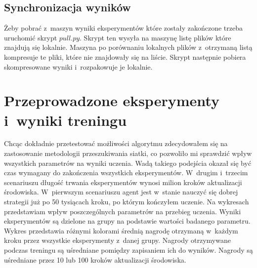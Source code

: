 \documentclass[12pt, oneside]{article}
\begin{document}
\subsection{Synchronizacja wyników}
Żeby pobrać z~maszyn wyniki eksperymentów które zostały zakończone trzeba uruchomić skrypt $pull.py$. Skrypt ten wysyła na maszynę listę plików które znajdują się lokalnie. Maszyna po porównaniu lokalnych plików z~otrzymaną listą kompresuje te pliki, które nie znajdowały się na liście. Skrypt następnie pobiera skompresowane wyniki i~rozpakowuje je lokalnie.

\section{Przeprowadzone eksperymenty i~wyniki treningu}
Chcąc dokładnie przetestować możliwości algorytmu zdecydowałem się na zastosowanie metodologii przeszukiwania siatki, co pozwoliło mi sprawdzić wpływ wszystkich parametrów na wyniki uczenia. Wadą takiego podejścia okazał się być czas wymagany do zakończenia wszystkich eksperymentów. 
W~drugim i~trzecim scenariuszu długość trwania eksperymentów wynosi milion kroków aktualizacji środowiska. W~pierwszym scenariuszu agent jest w~stanie nauczyć się dobrej strategii już po 50 tysiącach kroku, po którym kończyłem uczenie.
Na wykresach przedstawiam wpływ poszczególnych parametrów na przebieg uczenia. Wyniki eksperymentów są dzielone na grupy na podstawie wartości badanego parametru. Wykres przedstawia różnymi kolorami średnią nagrodę otrzymaną w~każdym kroku przez wszystkie eksperymenty z~danej grupy. 
Nagrody otrzymywane podczas treningu są uśredniane pomiędzy zapisaniem ich do wyników. Nagrody są uśredniane przez 10 lub 100 kroków aktualizacji środowiska.
\newpage
\end{document}
